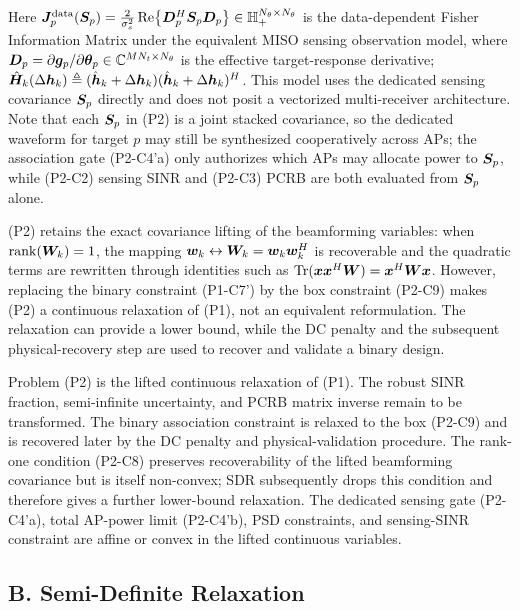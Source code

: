 Here $\bm{J}_p^{\text{data}}(\bm{S}_p) = \frac{2}{\sigma_s^2} \operatorname{Re}\!\left\{ \bm{D}_p^H \bm{S}_p \bm{D}_p \right\} \in \mathbb{H}_+^{N_\theta \times N_\theta}$ is the data-dependent Fisher Information Matrix under the equivalent MISO sensing observation model, where $\bm{D}_p = \partial \bm{g}_p / \partial \boldsymbol{\theta}_p \in \mathbb{C}^{MN_t \times N_\theta}$ is the effective target-response derivative; $\hat{\bm{H}}_k(\Delta\bm{h}_k) \triangleq (\hat{\bm{h}}_k + \Delta\bm{h}_k)(\hat{\bm{h}}_k + \Delta\bm{h}_k)^H$. This model uses the dedicated sensing covariance $\bm{S}_p$ directly and does not posit a vectorized multi-receiver architecture. Note that each $\bm{S}_p$ in (P2) is a joint stacked covariance, so the dedicated waveform for target $p$ may still be synthesized cooperatively across APs; the association gate (P2-C4'a) only authorizes which APs may allocate power to $\bm{S}_p$, while (P2-C2) sensing SINR and (P2-C3) PCRB are both evaluated from $\bm{S}_p$ alone.

(P2) retains the exact covariance lifting of the beamforming variables: when $\operatorname{rank}(\bm{W}_k)=1$, the mapping $\bm{w}_k \leftrightarrow \bm{W}_k=\bm{w}_k\bm{w}_k^H$ is recoverable and the quadratic terms are rewritten through identities such as $\operatorname{Tr}(\bm{x}\bm{x}^H\bm{W})=\bm{x}^H\bm{W}\bm{x}$. However, replacing the binary constraint (P1-C7') by the box constraint (P2-C9) makes (P2) a continuous relaxation of (P1), not an equivalent reformulation. The relaxation can provide a lower bound, while the DC penalty and the subsequent physical-recovery step are used to recover and validate a binary design.

Problem (P2) is the lifted continuous relaxation of (P1). The robust SINR fraction, semi-infinite uncertainty, and PCRB matrix inverse remain to be transformed. The binary association constraint is relaxed to the box (P2-C9) and is recovered later by the DC penalty and physical-validation procedure. The rank-one condition (P2-C8) preserves recoverability of the lifted beamforming covariance but is itself non-convex; SDR subsequently drops this condition and therefore gives a further lower-bound relaxation. The dedicated sensing gate (P2-C4'a), total AP-power limit (P2-C4'b), PSD constraints, and sensing-SINR constraint are affine or convex in the lifted continuous variables.

\subsection*{B. Semi-Definite Relaxation}

